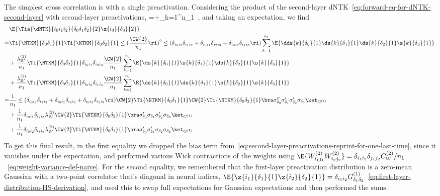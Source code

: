 The simplest cross correlation is with a single preactivation.
Considering the product of the second-layer dNTK~\eqref{eq:forward-eq-for-dNTK-second-layer} with second-layer preactivations,
\be\label{eq:second-layer-preactivations-reprint-for-one-last-time}
=+\sum_{k=1}^{n_{1}}\, ,%
\ee
and taking an expectation, we find
\begin{align}\label{eq:second-layer-dNTK-mid}
&\E{\Tia{\dNTK}{i_0i_1i_2}{\delta_0\delta_1\delta_2}{2}\z{i_3}{\delta_3}{2}} \notag \\ %
=&\Ti{\NTKM}{\delta_0\delta_1}{1}\Ti{\NTKM}{\delta_0\delta_2}{1}\le(\frac{\CW{2}}{n_1}\ri)^2\le(\delta_{i_0 i_3}\delta_{i_1i_2}+\delta_{i_0 i_1}\delta_{i_2 i_3}+\delta_{i_0 i_2}\delta_{i_1 i_3}\ri)\sum_{k=1}^{n_1}\E{\dds{k}{\delta_0}{1}\ds{k}{\delta_1}{1}\ds{k}{\delta_2}{1}\s{k}{\delta_3}{1}}\, \notag\\
&+\frac{\lambda_{W}^{(2)}}{n_1}\Ti{\NTKM}{\delta_0\delta_2}{1}\delta_{i_0i_1}\delta_{i_2i_3}\frac{\CW{2}}{n_1} \sum_{k=1}^{n_{1}}\E{\ds{k}{\delta_0}{1}\s{k}{\delta_1}{1}\ds{k}{\delta_2}{1}\s{k}{\delta_3}{1}}\, \notag\\
&+\frac{\lambda_{W}^{(2)}}{n_1}\Ti{\NTKM}{\delta_0\delta_1}{1}\delta_{i_0i_2}\delta_{i_1i_3}\frac{\CW{2}}{n_1} \sum_{k=1}^{n_{1}}\E{\ds{k}{\delta_0}{1}\ds{k}{\delta_1}{1}\s{k}{\delta_2}{1}\s{k}{\delta_3}{1}}\, \notag \\
=&\frac{1}{n_1}\le(\delta_{i_0 i_3}\delta_{i_1i_2}+\delta_{i_0 i_1}\delta_{i_2 i_3}+\delta_{i_0 i_2}\delta_{i_1 i_3}\ri)\CW{2}\Ti{\NTKM}{\delta_0\delta_1}{1}\CW{2}\Ti{\NTKM}{\delta_0\delta_2}{1}\bra \sigma''_{\delta_0}\sigma'_{\delta_1}\sigma'_{\delta_2}\sigma_{\delta_3}\ket_{G^{(1)}}\, \notag\\
&+\frac{1}{n_1}\delta_{i_0i_1}\delta_{i_2i_3}\lambda_{W}^{(2)}\CW{2}\Ti{\NTKM}{\delta_0\delta_2}{1} \bra \sigma'_{\delta_0}\sigma_{\delta_1}\sigma'_{\delta_2}\sigma_{\delta_3}\ket_{G^{(1)}}\, \notag\\
&+\frac{1}{n_1}\delta_{i_0i_2}\delta_{i_1i_3}\lambda_{W}^{(2)}\CW{2}\Ti{\NTKM}{\delta_0\delta_1}{1} \bra \sigma'_{\delta_0}\sigma'_{\delta_1}\sigma_{\delta_2}\sigma_{\delta_3}\ket_{G^{(1)}}\, 
\end{align}
To get this final result, in the first equality we dropped the bias term from~\eqref{eq:second-layer-preactivations-reprint-for-one-last-time}, since it vanishes under the expectation,  and performed various Wick contractions of the weights using
$\E{W^{(2)}_{i_1 j_1}W^{(2)}_{i_2 j_2}} =\delta_{i_1 i_2} \delta_{j_1 j_2}C_{W}^{(2)}/n_{1}$~\eqref{eq:weight-variance-def-naive}.
For the second equality, we remembered that the first-layer preactivation distribution is a zero-mean Gaussian with a two-point correlator that's diagonal in neural indices, $\E{\z{i_1}{\delta_1}{1}\z{i_2}{\delta_2}{1}} = \delta_{i_1i_2}G_{\delta_1\delta_2}^{(1)}$~\eqref{eq:first-layer-distribution-HS-derivation}, and used this to swap full expectations for Gaussian expectations and then performed the sums.

